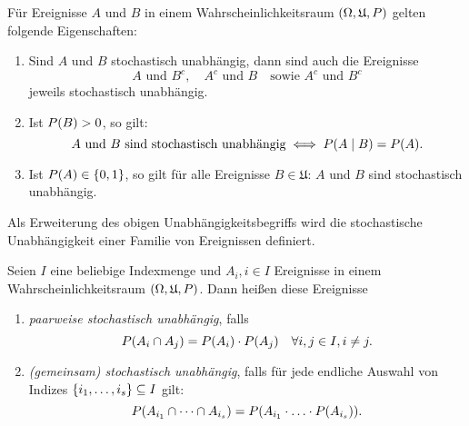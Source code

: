 \documentclass{lecture}
\begin{document}
    \begin{lemma}
        Für Ereignisse \(A\) und \(B\) in einem Wahrscheinlichkeitsraum \(\parentheses*{\Omega, \mathfrak{U}, P}\) gelten folgende Eigenschaften:
        \begin{enumerate}
            \item Sind \(A\) und \(B\) stochastisch unabhängig, dann sind auch die Ereignisse
            \[
                A\text{ und }B^c, \quad A^c\text{ und }B \quad \text{sowie }A^c\text{ und }B^c
            \]
            jeweils stochastisch unabhängig.
            \item Ist \(P\parentheses*{B} > 0\), so gilt:
            \[
                A\text{ und }B\text{ sind stochastisch unabhängig} \iff P\parentheses*{A \mid B} = P\parentheses*{A}.
            \]
            \item Ist \(P\parentheses*{A} \in \braces*{0, 1}\), so gilt für alle Ereignisse \(B \in \mathfrak{U}\): \(A\) und \(B\) sind stochastisch unabhängig.
        \end{enumerate}
    \end{lemma}

    Als Erweiterung des obigen Unabhängigkeitsbegriffs wird die stochastische Unabhängigkeit einer Familie von Ereignissen definiert.

    \begin{definition}
        Seien \(I\) eine beliebige Indexmenge und \(A_i, i \in I\) Ereignisse in einem Wahrscheinlichkeitsraum \(\parentheses*{\Omega, \mathfrak{U}, P}\).
        Dann heißen diese Ereignisse
        \begin{enumerate}
            \item \emph{paarweise stochastisch unabhängig}, falls
            \[
                P\parentheses*{A_i \cap A_j} = P\parentheses*{A_i} \cdot P\parentheses*{A_j} \quad \forall i, j \in I, i \ne j.
            \]
            \item \emph{(gemeinsam) stochastisch unabhängig}, falls für jede endliche Auswahl von Indizes \(\braces*{i_1, \ldots, i_s} \subseteq I\) gilt:
            \[
                P\parentheses*{A_{i_1} \cap \cdots \cap A_{i_s}} = P\parentheses*{A_{i_1} \cdot \ldots \cdot P\parentheses*{A_{i_s}}}.
            \]
        \end{enumerate}
    \end{definition}
\end{document}

